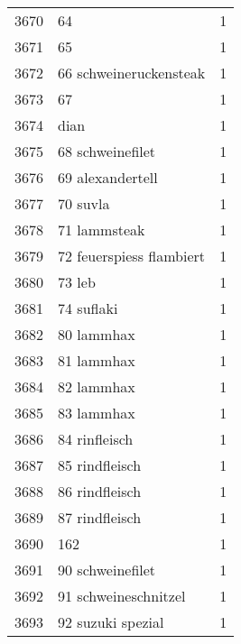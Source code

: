 \begin{tabular}{llr}
3670 &                                                 64 &      1 \\
3671 &                                                 65 &      1 \\
3672 &                             66 schweineruckensteak &      1 \\
3673 &                                                 67 &      1 \\
3674 &                                               dian &      1 \\
3675 &                                   68 schweinefilet &      1 \\
3676 &                                   69 alexandertell &      1 \\
3677 &                                           70 suvla &      1 \\
3678 &                                       71 lammsteak &      1 \\
3679 &                           72 feuerspiess flambiert &      1 \\
3680 &                                             73 leb &      1 \\
3681 &                                         74 suflaki &      1 \\
3682 &                                         80 lammhax &      1 \\
3683 &                                         81 lammhax &      1 \\
3684 &                                         82 lammhax &      1 \\
3685 &                                         83 lammhax &      1 \\
3686 &                                      84 rinfleisch &      1 \\
3687 &                                     85 rindfleisch &      1 \\
3688 &                                     86 rindfleisch &      1 \\
3689 &                                     87 rindfleisch &      1 \\
3690 &                                                162 &      1 \\
3691 &                                   90 schweinefilet &      1 \\
3692 &                               91 schweineschnitzel &      1 \\
3693 &                                  92 suzuki spezial &      1 \\

\end{tabular}
